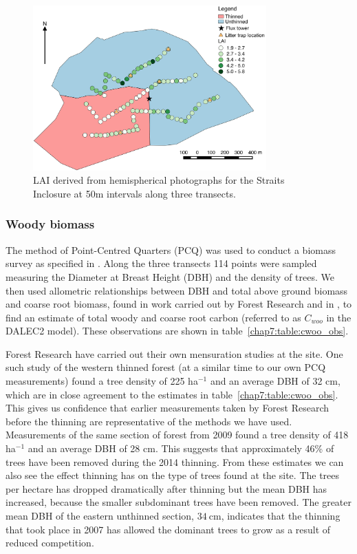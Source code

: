 \begin{figure}[ht]
    \centering
    \includegraphics[width=0.8\textwidth]{chapter/chapter7/thinned.pdf}
    \caption{LAI derived from hemispherical photographs for the Straits Inclosure at 50m intervals along three transects.} \label{chap7:fig:hemi_lai}
\end{figure}

\subsubsection{Woody biomass}  
The method of Point-Centred Quarters (PCQ) was used to conduct a biomass survey as specified in \citet{dahdouh2006empirical}. Along the three transects 114 points were sampled measuring the Diameter at Breast Height (DBH) and the density of trees. We then used allometric relationships between DBH and total above ground biomass and coarse root biomass, found in work carried out by Forest Research and in \citet{mckay2003woodfuel}, to find an estimate of total woody and coarse root carbon (referred to as \(C_{woo}\) in the DALEC2 model). These observations are shown in table~\ref{chap7:table:cwoo_obs}.

Forest Research have carried out their own mensuration studies at the site. One such study of the western thinned forest (at a similar time to our own PCQ measurements) found a tree density of 225 ha\(^{-1}\) and an average DBH of 32 cm, which are in close agreement to the estimates in table~\ref{chap7:table:cwoo_obs}. This gives us confidence that earlier measurements taken by Forest Research before the thinning are representative of the methods we have used. Measurements of the same section of forest from 2009 found a tree density of 418 ha\(^{-1}\) and an average DBH of 28 cm. This suggests that approximately 46\% of trees have been removed during the 2014 thinning. From these estimates we can also see the effect thinning has on the type of trees found at the site. The trees per hectare has dropped dramatically after thinning but the mean DBH has increased, because the smaller subdominant trees have been removed. The greater mean DBH of the eastern unthinned section, \(34~\text{cm}\), indicates that the thinning that took place in 2007 has allowed the dominant trees to grow as a result of reduced competition.

